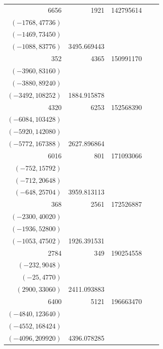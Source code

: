 \documentclass[11pt]{article}
\begin{document}
\begin{longtable}{r r r l r}
6656 & 1921 & 142795614 & \begin{tabular}[t]{@{}l@{}}$(-1808,41584)$\\$(-1768,47736)$\\$(-1469,73450)$\\$(-1088,83776)$\end{tabular} & 3495.669443\\[5pt]
352 & 4365 & 150991170 & \begin{tabular}[t]{@{}l@{}}$(-4312,32648)$\\$(-3960,83160)$\\$(-3880,89240)$\\$(-3492,108252)$\end{tabular} & 1884.915878\\[5pt]
4320 & 6253 & 152568390 & \begin{tabular}[t]{@{}l@{}}$(-6144,83712)$\\$(-6084,103428)$\\$(-5920,142080)$\\$(-5772,167388)$\end{tabular} & 2627.896864\\[5pt]
6016 & 801 & 171093066 & \begin{tabular}[t]{@{}l@{}}$(-784,9520)$\\$(-752,15792)$\\$(-712,20648)$\\$(-648,25704)$\end{tabular} & 3959.813113\\[5pt]
368 & 2561 & 172526887 & \begin{tabular}[t]{@{}l@{}}$(-2548,9828)$\\$(-2300,40020)$\\$(-1936,52800)$\\$(-1053,47502)$\end{tabular} & 1926.391531\\[5pt]
2784 & 349 & 190254558 & \begin{tabular}[t]{@{}l@{}}$(-348,1044)$\\$(-232,9048)$\\$(-25,4770)$\\$(2900,33060)$\end{tabular} & 2411.093883\\[5pt]
6400 & 5121 & 196663470 & \begin{tabular}[t]{@{}l@{}}$(-5120,7680)$\\$(-4840,123640)$\\$(-4552,168424)$\\$(-4096,209920)$\end{tabular} & 4396.078285\\[5pt]

\end{longtable}
\end{document}
